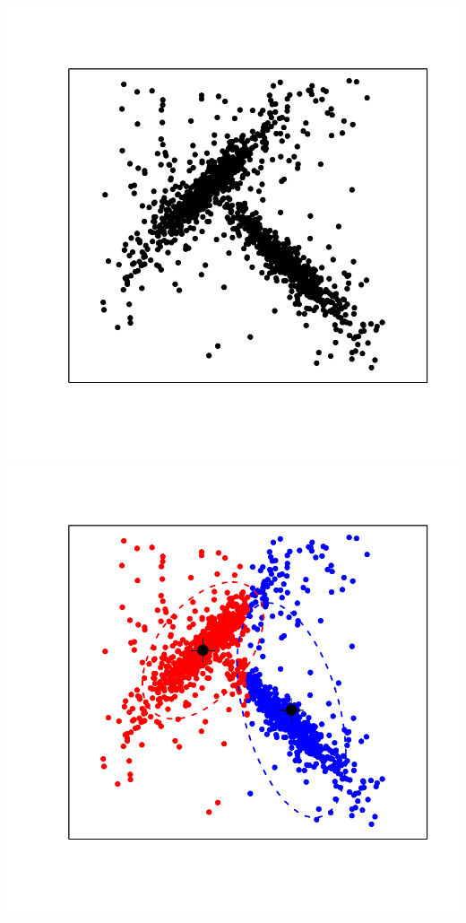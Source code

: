 \documentclass[landscape,footrule]{foils}
\begin{document}
\centerline{
\includegraphics[scale=0.6]{hard-gmm-1}\hspace*{-1.7cm}\includegraphics[scale=0.6]{hard-gmm-2}
\vspace*{-2.6cm}}
\end{document}
